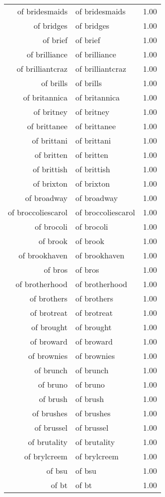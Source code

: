 \begin{table}[ht]
\begin{tabular}{rlr}
  of bridesmaids & of bridesmaids & 1.00 \\ 
  of bridges & of bridges & 1.00 \\ 
  of brief & of brief & 1.00 \\ 
  of brilliance & of brilliance & 1.00 \\ 
  of brilliantcraz & of brilliantcraz & 1.00 \\ 
  of brills & of brills & 1.00 \\ 
  of britannica & of britannica & 1.00 \\ 
  of britney & of britney & 1.00 \\ 
  of brittanee & of brittanee & 1.00 \\ 
  of brittani & of brittani & 1.00 \\ 
  of britten & of britten & 1.00 \\ 
  of brittish & of brittish & 1.00 \\ 
  of brixton & of brixton & 1.00 \\ 
  of broadway & of broadway & 1.00 \\ 
  of broccoliescarol & of broccoliescarol & 1.00 \\ 
  of brocoli & of brocoli & 1.00 \\ 
  of brook & of brook & 1.00 \\ 
  of brookhaven & of brookhaven & 1.00 \\ 
  of bros & of bros & 1.00 \\ 
  of brotherhood & of brotherhood & 1.00 \\ 
  of brothers & of brothers & 1.00 \\ 
  of brotreat & of brotreat & 1.00 \\ 
  of brought & of brought & 1.00 \\ 
  of broward & of broward & 1.00 \\ 
  of brownies & of brownies & 1.00 \\ 
  of brunch & of brunch & 1.00 \\ 
  of bruno & of bruno & 1.00 \\ 
  of brush & of brush & 1.00 \\ 
  of brushes & of brushes & 1.00 \\ 
  of brussel & of brussel & 1.00 \\ 
  of brutality & of brutality & 1.00 \\ 
  of brylcreem & of brylcreem & 1.00 \\ 
  of bsu & of bsu & 1.00 \\ 
  of bt & of bt & 1.00 \\ 

\end{tabular}
\end{table}

